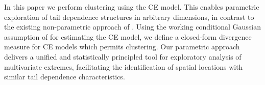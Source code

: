 \documentclass[
  12pt]{article}
\begin{document}

In this paper we perform clustering using the CE model. 
This enables parametric exploration of tail dependence structures in arbitrary dimensions, in contrast to the existing non-parametric approach of \citet{Vignotto2021}.
Using the working conditional Gaussian assumption of \citet{Heffernan2004} for estimating the CE model, we define a closed-form divergence measure for CE models which permits clustering.
Our parametric approach delivers a unified and statistically principled tool for exploratory analysis of multivariate extremes, facilitating the identification of spatial locations with similar tail dependence characteristics.  
\end{document}

